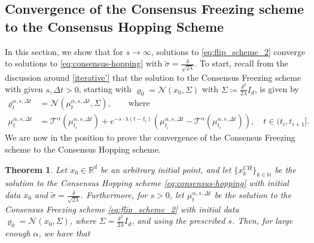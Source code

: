 \documentclass[reqno]{amsart}
\numberwithin{algorithm}{section}
\newcommand{\RR}{\mathbb{R}}
\newcommand{\Xalpha}{{X^\alpha}}
\newcommand{\Xai}{{\Xalpha(\rho_{t_i})}}
\newcommand{\NN}{{\mathbb N}}
\newcommand{\mc}[1]{\mathcal{#1}}
\newtheorem{theorem}{Theorem}[section]
\begin{document}
{\subsection{Convergence of the Consensus Freezing scheme to the Consensus Hopping Scheme}
In this section, we show that for $s \to \infty$, solutions to \eqref{eq:flip_scheme_2} converge to solutions to \eqref{eq:consensus-hopping} with $\tilde{\sigma} = \frac{\delta}{\sqrt{2\lambda}}$. To start, recall from the discussion around \cref{iterative'} that the solution to the Consensus Freezing scheme with given $s,\Delta t>0$, starting with $\varrho_0 = \mathcal{N}(x_0, \Sigma)$ with $\Sigma \coloneqq \frac{\delta^2}{2\lambda} I_d$, is given by
\begin{equation}\label{eq:flip_scheme_solution_s}
    \begin{split}
        \varrho^{\alpha,s,\Delta t}_t &= \mathcal{N}(\mu^{\alpha,s,\Delta t}_t, \Sigma), \qquad \text{where} \\
        \mu^{\alpha,s,\Delta t}_t &= \mc{T}^\alpha(\mu^{\alpha,s,\Delta t}_{t_i})+e^{-s \cdot \lambda(t-t_i)}(\mu^{\alpha,s,\Delta t}_{t_i}-\mc{T}^\alpha(\mu^{\alpha,s,\Delta t}_{t_i})), \quad t \in (t_i, t_{i+1}].
    \end{split}
\end{equation}
We are now in the position to prove the convergence of the Consensus Freezing scheme to the Consensus Hopping scheme.
\begin{theorem}\label{thm:FStoHS}
    Let $x_0 \in \RR^d$ be an arbitrary initial point, and let $\{x_k^{CH}\}_{k \in \NN}$ be the solution to the Consensus Hopping scheme \eqref{eq:consensus-hopping} with initial data $x_0$ and $\tilde{\sigma} = \frac{\delta}{\sqrt{2\lambda}}$. Furthermore, for $s > 0$, let $\mu_t^{\alpha,s,\Delta t}$ be the solution to the Consensus Freezing scheme \eqref{eq:flip_scheme_2} with initial data $\varrho_0 = \mathcal{N}(x_0, \Sigma)$, where $\Sigma = \frac{\delta^2}{2\lambda} I_d$, and using the prescribed $s$. Then, for large enough $\alpha$, we have that

\end{theorem}}
\end{document}
